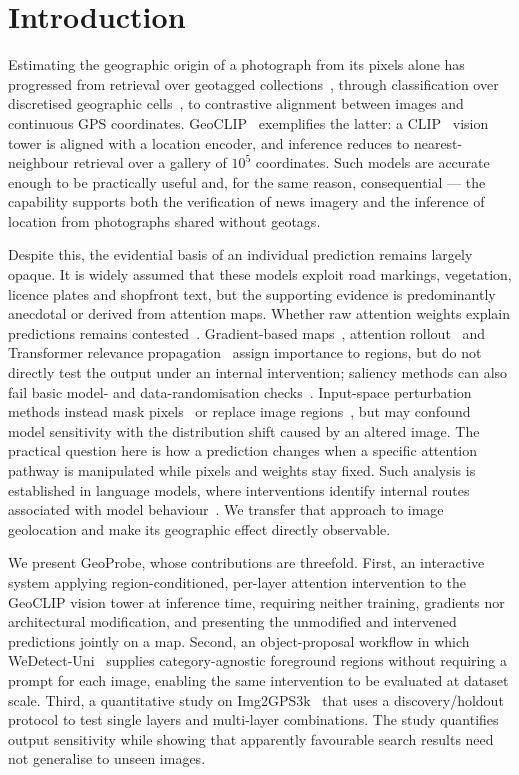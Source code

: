 \section{Introduction}

Estimating the geographic origin of a photograph from its pixels alone has
progressed from retrieval over geotagged collections~\cite{hays2008im2gps},
through classification over discretised geographic
cells~\cite{weyand2016planet,pramanick2022translocator}, to contrastive
alignment between images and continuous GPS coordinates.
GeoCLIP~\cite{cepeda2023geoclip} exemplifies the latter: a
CLIP~\cite{radford2021clip} vision tower is aligned with a location encoder,
and inference reduces to nearest-neighbour retrieval over a gallery of
$10^{5}$ coordinates. Such models are accurate enough to be practically useful
and, for the same reason, consequential --- the capability supports both the
verification of news imagery and the inference of location from photographs
shared without geotags.

Despite this, the evidential basis of an individual prediction remains
largely opaque. It is widely assumed that these models exploit road
markings, vegetation, licence plates and shopfront text, but the supporting
evidence is predominantly anecdotal or derived from attention maps.
Whether raw attention weights explain predictions remains
contested~\cite{jain2019attention,wiegreffe2019attention}. Gradient-based
maps~\cite{selvaraju2017gradcam}, attention rollout~\cite{abnar2020rollout}
and Transformer relevance propagation~\cite{chefer2021transformer} assign
importance to regions, but do not directly test the output under an internal
intervention; saliency methods can also fail basic model- and data-randomisation
checks~\cite{adebayo2018sanity}. Input-space perturbation methods instead mask
pixels~\cite{petsiuk2018rise} or replace image regions~\cite{goyal2019counterfactual},
but may confound model sensitivity with the distribution shift caused by an
altered image. The practical question here is how a prediction changes when a
specific attention pathway is manipulated while pixels and weights stay fixed.
Such analysis is established in language models, where interventions identify
internal routes associated with model behaviour~\cite{vig2020causal,meng2022rome,geva2023dissecting}.
We transfer that approach to image
geolocation and make its geographic effect directly observable.

We present GeoProbe, whose contributions are threefold. First, an
interactive system applying region-conditioned, per-layer attention
intervention to the GeoCLIP vision tower at inference time, requiring
neither training, gradients nor architectural modification, and presenting
the unmodified and intervened predictions jointly on a map. Second, an
object-proposal workflow in which WeDetect-Uni~\cite{fu2026wedetect}
supplies category-agnostic foreground regions without requiring a prompt for
each image, enabling the same intervention to be evaluated at dataset scale.
Third, a quantitative study on Img2GPS3k~\cite{vo2017revisiting} that uses a
discovery/holdout protocol to test single layers and multi-layer
combinations. The study quantifies output sensitivity while showing that
apparently favourable search results need not generalise to unseen images.

